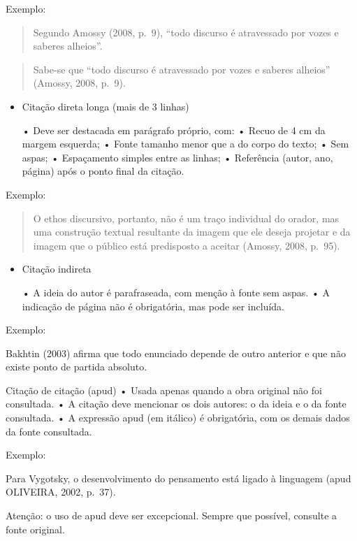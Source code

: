 \documentclass[
  letterpaper,
  DIV=11,
  numbers=noendperiod]{scrreprt}
\begin{document}
Exemplo:

\begin{quote}
Segundo Amossy (2008, p.~9), ``todo discurso é atravessado por vozes e
saberes alheios''.
\end{quote}

\begin{quote}
Sabe-se que ``todo discurso é atravessado por vozes e saberes alheios''
(Amossy, 2008, p.~9).
\end{quote}

\begin{itemize}
\item
  Citação direta longa (mais de 3 linhas)

  • Deve ser destacada em parágrafo próprio, com: • Recuo de 4 cm da
  margem esquerda; • Fonte tamanho menor que a do corpo do texto; • Sem
  aspas; • Espaçamento simples entre as linhas; • Referência (autor,
  ano, página) após o ponto final da citação.
\end{itemize}

Exemplo:

\begin{quote}
O ethos discursivo, portanto, não é um traço individual do orador, mas
uma construção textual resultante da imagem que ele deseja projetar e da
imagem que o público está predisposto a aceitar (Amossy, 2008, p.~95).
\end{quote}

\begin{itemize}
\item
  Citação indireta

  • A ideia do autor é parafraseada, com menção à fonte sem aspas. • A
  indicação de página não é obrigatória, mas pode ser incluída.
\end{itemize}

Exemplo:

Bakhtin (2003) afirma que todo enunciado depende de outro anterior e que
não existe ponto de partida absoluto.

Citação de citação (apud) • Usada apenas quando a obra original não foi
consultada. • A citação deve mencionar os dois autores: o da ideia e o
da fonte consultada. • A expressão apud (em itálico) é obrigatória, com
os demais dados da fonte consultada.

Exemplo:

Para Vygotsky, o desenvolvimento do pensamento está ligado à linguagem
(apud OLIVEIRA, 2002, p.~37).

Atenção: o uso de apud deve ser excepcional. Sempre que possível,
consulte a fonte original.
\end{document}
